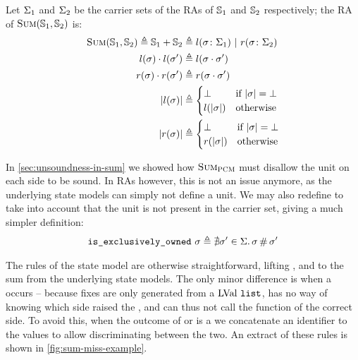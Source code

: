 Let $\Sigma_1$ and $\Sigma_2$ be the carrier sets of the RAs of $\mathbb S_1$ and $\mathbb S_2$ respectively; the RA of $\textsc{Sum}(\mathbb S_1,\mathbb S_2)$ is:
\begin{align*}
	\textsc{Sum}(\mathbb S_1, \mathbb S_2) \triangleq \mathbb S_1+\mathbb S_2 &\triangleq l(\sigma\colon \Sigma_1) ~|~ r(\sigma\colon \Sigma_2)\\
	l(\sigma)\cdot l(\sigma') &\triangleq l(\sigma\cdot \sigma')\\
	r(\sigma)\cdot r(\sigma') &\triangleq r(\sigma\cdot \sigma')\\
	|l(\sigma)|&\triangleq \begin{cases}
 		\bot &\text{if}~ |\sigma|=\bot\\
 		l(|\sigma|) &\text{otherwise}
	 \end{cases}\\
	 |r(\sigma)|&\triangleq \begin{cases}
 		\bot &\text{if}~ |\sigma|=\bot\\
 		r(|\sigma|) &\text{otherwise}
	 \end{cases}
\end{align*}

In \cref{sec:unsoundness-in-sum} we showed how $\textsc{Sum}_{\textsc{PCM}}$ must disallow the unit on each side to be sound. In RAs however, this is not an issue anymore, as the underlying state models can simply not define a unit. We may also redefine \isexowned{} to take into account that the unit is not present in the carrier set, giving a much simpler definition: \begin{align*}
	\texttt{is\_exclusively\_owned}~\sigma \triangleq \nexists \sigma'\in\Sigma\ldotp \sigma\operatorname{\#}\sigma'
\end{align*}

The rules of the \Sum{} state model are otherwise straightforward, lifting \execac, \consume{} and \produce{} to the sum from the underlying state models. The only minor difference is when a \Miss{} occurs -- because fixes are only generated from a $\text{LVal}~\texttt{list}$, \Sum{} has no way of knowing which side raised the \Miss, and can thus not call the \fix{} function of the correct side. To avoid this, when the outcome of \execac{} or \consume{} is a \Miss{} we concatenate an identifier to the values to allow discriminating between the two. An extract of these rules is shown in \autoref{fig:sum-miss-example}.

